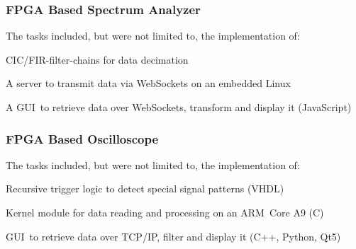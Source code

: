 \begin{timeline}
    \subsubsection{FPGA Based Spectrum Analyzer}
    The tasks included, but were not limited to, the implementation of:
    \begin{tightemize}
    \item CIC/FIR-filter-chains for data decimation
    \item A server to transmit data via WebSockets on an embedded Linux
    \item A GUI to retrieve data over WebSockets, transform and display it (JavaScript)
    \end{tightemize}
    \sectionsep
    
    \subsubsection{FPGA Based Oscilloscope}
    The tasks included, but were not limited to, the implementation of:
    \begin{tightemize}
    \item Recursive trigger logic to detect special signal patterns (VHDL)
    \item Kernel module for data reading and processing on an ARM Core A9 (C)
    \item GUI to retrieve data over TCP/IP, filter and display it (C++, Python, Qt5)
    \end{tightemize}
    \sectionsep

    \end{timeline}%